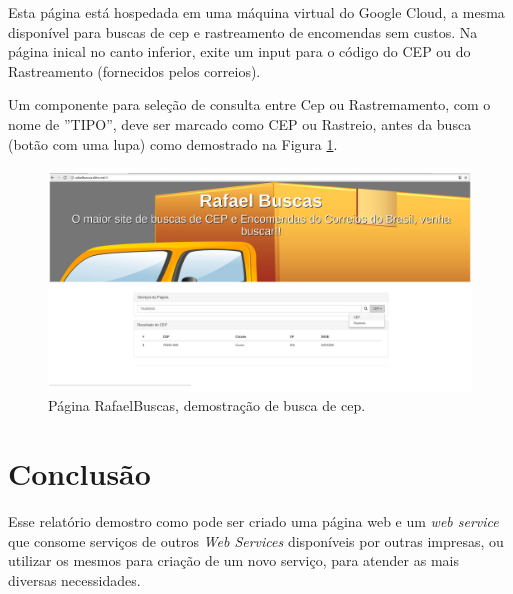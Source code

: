 \documentclass[12pt]{article}
\begin{document}
	  	Esta página está hospedada em uma máquina virtual do Google Cloud, a mesma disponível para buscas de cep e rastreamento de encomendas sem custos.
	  	Na página inical no canto inferior, exite um input para o código do CEP ou do Rastreamento (fornecidos pelos correios).
	  	
	  	Um componente para seleção de consulta entre Cep ou Rastremamento, com o nome de ''TIPO'', deve ser marcado como CEP ou Rastreio, antes da busca (botão com uma lupa) como demostrado na Figura \ref{c2}.
	  	
	  		 \begin{figure}[H]
	  		\centering
	  		\includegraphics[scale=0.23]{Imagens/c2.jpg}
	  		\caption{Página RafaelBuscas, demostração de busca de cep.}
	  		\label{c2}
	  	\end{figure}
\section{Conclusão}
Esse relatório demostro como pode ser criado uma página web e um \textit{web service}  que consome serviços de outros \textit{Web Services} disponíveis por outras impresas, ou utilizar os mesmos para criação de um novo serviço, para atender as mais diversas necessidades.	  	

	  
\end{document}
